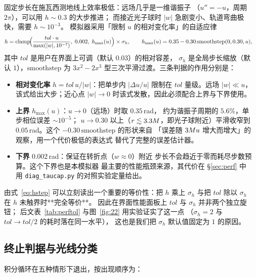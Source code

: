 固定步长在施瓦西测地线上效率极低：远场几乎是一维谐振子
（$u''=-u$，周期 $2\pi$），可以用 $h\sim0.3$ 的大步推进；
而接近光子球时 $|w|$ 急剧变小、轨道弯曲极快，需要 $h\sim10^{-3}$。
模拟器采用「限制 $u$ 的相对变化率」的自适应律
\begin{equation}
h=\operatorname{clamp}\!\Bigl(\frac{tol\cdot u}{\max(|w|,10^{-7})},\;
0.002,\;h_{\max}(u)\Bigr)\times\sigma_h,
\qquad
h_{\max}(u)=0.35-0.30\,\mathrm{smoothstep}(0,0.30,u),
\label{eq:hstep}
\end{equation}
其中 $tol$ 是用户在界面上可调（默认 $0.03$）的相对容差，
$\sigma_h$ 是全局步长缩放（默认 $1$），$\mathrm{smoothstep}$ 为
$3x^2-2x^3$ 型三次平滑过渡。三条判据的作用分别是：

\begin{itemize}\itemsep2pt
\item \textbf{相对变化率} $h=tol\,u/|w|$：把单步内 $|\Delta u/u|$
  限制在 $tol$ 量级。远场 $|w|\ll u$，该式给出大步；近心点
  $|w|\to0$ 时该式发散，因此必须配合上界与下界使用。
\item \textbf{上界} $h_{\max}(u)$：$u\to0$（远场）时取 $0.35$\,rad，
  约为谐振子周期的 $5.6\%$，单步相位误差 $\sim10^{-5}$；
  $u\to0.30$ 以上（$r\lesssim3.3M$，即光子球附近）平滑收窄到
  $0.05$\,rad。这个 $-0.30\,\mathrm{smoothstep}$ 的形状来自
  「误差随 $3M u$ 增大而增大」的观察，用一个代价极低的表达式
  替代了完整的误差估计器。
\item \textbf{下界} $0.002$\,rad：保证在转折点（$w\approx0$）附近
  步长不会趋近于零而耗尽步数预算。这个下界也是本模拟器
  最主要的性能瓶颈来源，其代价在 \S\ref{sec:perf} 中用
  \texttt{diag\_taucap.py} 的对照实验定量给出。
\end{itemize}

由式~\eqref{eq:hstep} 可以立刻读出一个重要的等价性：把 $h$ 乘上
$\sigma_h$ 与把 $tol$ 除以 $\sigma_h$ 在 $h$ 未触界时**完全等价**。
因此在界面性能面板上 $tol$ 与 $\sigma_h$ 并非两个独立旋钮；
后文表~\ref{tab:perftol} 与图~\ref{fig:22} 用实验证实了这一点
（$\sigma_h=2$ 与 $tol\to tol/2$ 的耗时落在同一水平），
这也是我们把 $\sigma_h$ 默认值固定为 $1$ 的原因。



\subsection{终止判据与光线分类}\label{sec:termination}

积分循环在五种情形下退出，按出现顺序为：

